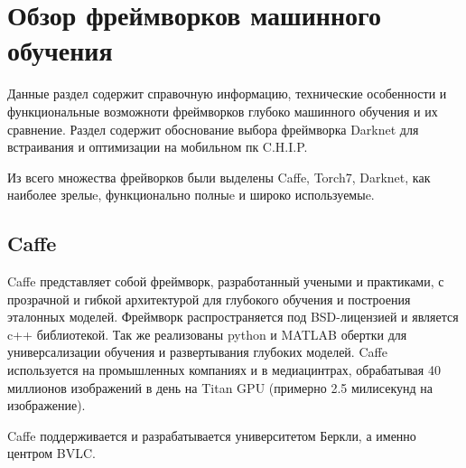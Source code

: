 \documentclass[a4paper,english,russian]{G2-105}
\begin{document}
\chapter{Обзор фреймворков машинного обучения} 
\par Данные раздел содержит справочную информацию, технические особенности и функциональные возможноти фреймворков глубоко машинного обучения и их сравнение. Раздел содержит обоснование выбора фреймворка Darknet для встраивания и оптимизации на мобильном пк C.H.I.P.
\par Из всего множества фрейворков были выделены Caffe, Torch7, Darknet, как наиболее зрелыe, функционально полныe и широко используемыe.
\ttl
\section{Caffe}
\par Caffe представляет собой фреймворк, разработанный учеными и практиками, с прозрачной и гибкой архитектурой для глубокого обучения и построения эталонных моделей. Фреймворк распространяется под BSD-лицензией и является c++ библиотекой. Так же реализованы python и MATLAB обертки для универсализации обучения и развертывания глубоких моделей. Caffe используется на промышленных компаниях и в медиацинтрах, обрабатывая 40 миллионов изображений в день на Titan GPU (примерно 2.5 милисекунд на изображение).
\par Caffe поддерживается и разрабатывается университетом Беркли, а именно центром BVLC.
\ttl
\end{document}
